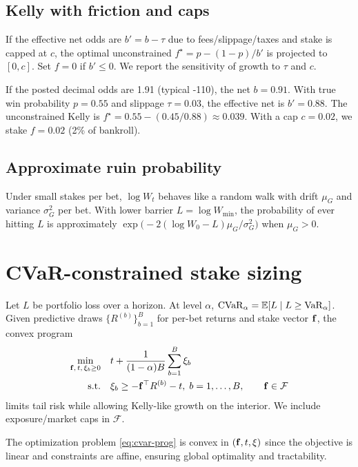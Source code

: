 \subsection{Kelly with friction and caps}\label{subsec:kelly-friction}
If the effective net odds are $b' = b - \tau$ due to fees/slippage/taxes and stake is capped at $c$,
the optimal unconstrained $f^\star=p-(1-p)/b'$ is projected to $[0,c]$. Set $f=0$ if $b'\le 0$.
We report the sensitivity of growth to $\tau$ and $c$.

\begin{example}
If the posted decimal odds are 1.91 (typical -110), the net $b=0.91$. With true win probability $p=0.55$ and slippage $\tau=0.03$, the effective net is $b'=0.88$. The unconstrained Kelly is $f^\star=0.55-(0.45/0.88)\approx 0.039$. With a cap $c=0.02$, we stake $f=0.02$ (2\% of bankroll).
\end{example}

\subsection{Approximate ruin probability}\label{subsec:ruin}
Under small stakes per bet, $\log W_t$ behaves like a random walk with drift $\mu_G$ and variance
$\sigma_G^2$ per bet. With lower barrier $L=\log W_{\min}$, the probability of ever hitting $L$ is
approximately $\exp\!\big(-2(\log W_0-L)\mu_G/\sigma_G^2\big)$ when $\mu_G>0$.

\section{CVaR-constrained stake sizing}\label{sec:cvar-math}
Let $L$ be portfolio loss over a horizon. At level $\alpha$, $\mathrm{CVaR}_\alpha=\mathbb{E}[L\mid L\ge \mathrm{VaR}_\alpha]$.
Given predictive draws $\{R^{(b)}\}_{b=1}^B$ for per-bet returns and stake vector $\mathbf{f}$, the convex
program
\begin{align}
\min_{\mathbf{f},\,t,\,\xi_b\ge0}\quad & t+\frac{1}{(1-\alpha)B}\sum_{b=1}^B \xi_b \label{eq:cvar-prog}\\
\text{s.t.}\quad & \xi_b \ge -\mathbf{f}^\top R^{(b)} - t,\; b=1,\dots,B,\qquad \mathbf{f}\in\mathcal{F} \nonumber
\end{align}
limits tail risk while allowing Kelly-like growth on the interior. We include exposure/market caps in $\mathcal{F}$.

\begin{theorem}
The optimization problem \eqref{eq:cvar-prog} is convex in $(\mathbf{f}, t, \xi)$ since the objective is linear and constraints are affine, ensuring global optimality and tractability.
\end{theorem}

